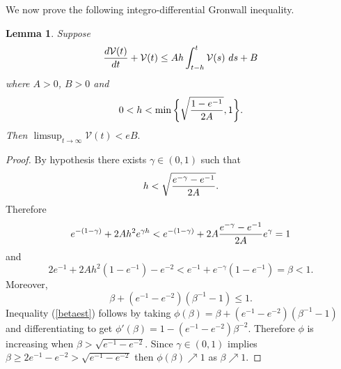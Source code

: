 \documentclass[master,tocprelim,12pt]{unrthesis}
\newtheorem{lemma}{Lemma}[chapter]
\theoremstyle{definition}
\newcommand{\cV}{{\mathcal V}}
\newcommand{\mydelta}{{h}}
\numberwithin{equation}{chapter}
\begin{document}
\begin{manuscript}
We now prove the following integro-differential Gronwall inequality.

\begin{lemma}\label{intGronwallerror}
Suppose
\begin{equation}\label{idineq}
    {d\cV(t)\over dt} +  \cV(t) 
	\leq A \mydelta \int_{t-\mydelta}^t  \cV(s) \ ds + B
\end{equation}
where $A>0$, $B>0$ and
$$ 0<\mydelta < \min\bigg\{\sqrt{1-e^{-1}\over 2A},1\bigg\}.$$
Then $\limsup_{t\to\infty} \cV(t)< eB.$
\end{lemma}
\begin{proof}
By hypothesis 
there exists $\gamma\in (0,1)$ such that
$$\mydelta< \sqrt{e^{-\gamma}-e^{-1}\over 2A}.$$
Therefore
\begin{equation}\label{est4R}
	e^{-(1-\gamma)}+2A\mydelta^2e^{\gamma\mydelta}
	< e^{-(1-\gamma)}+2A {e^{-\gamma}-e^{-1}\over 2A}e^{\gamma}
	=1
\end{equation}
and
\begin{equation}\label{est4B}
	2e^{-1}+2A\mydelta^2(1-e^{-1})-e^{-2}
		<e^{-1}+e^{-\gamma}(1-e^{-1}) = \beta<1.
\end{equation}
Moreover,
\begin{equation}\label{betaest}
	\beta+(e^{-1}-e^{-2})(\beta^{-1}-1)\le 1.
\end{equation}
Inequality (\ref{betaest}) follows by
taking $\phi(\beta)= \beta+(e^{-1}-e^{-2})(\beta^{-1}-1)$ and
differentiating to get
$\phi'(\beta)=1-(e^{-1}-e^{-2})\beta^{-2}$.
Therefore $\phi$ is increasing when
$\beta>\sqrt{e^{-1}-e^{-2}}$.
Since $\gamma\in(0,1)$ implies 
$\beta\ge 2e^{-1}-e^{-2}>\sqrt{e^{-1}-e^{-2}}$ then
$\phi(\beta)\nearrow 1$ as $\beta\nearrow 1$.


\end{proof}
\end{manuscript}
\end{document}
